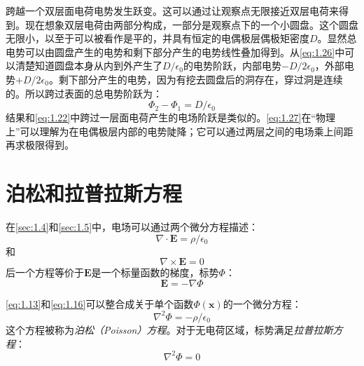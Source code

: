 \documentclass[12pt]{book}
\numberwithin{equation}{chapter}
\numberwithin{figure}{chapter}
\numberwithin{footnote}{page}
\begin{document}
跨越一个双层面电荷电势发生跃变。这可以通过让观察点无限接近双层电荷来得到。现在想象双层电荷由两部分构成，一部分是观察点下的一个小圆盘。这个圆盘无限小，以至于可以被看作是平的，并具有恒定的电偶极层偶极矩密度$D$。显然总电势可以由圆盘产生的电势和剩下部分产生的电势线性叠加得到。从\autoref{eq:1.26}中可以清楚知道圆盘本身从内到外产生了$D/\epsilon_0$的电势阶跃，内部电势$-D/2\epsilon_0$，外部电势$+D/2\epsilon_0$。剩下部分产生的电势，因为有挖去圆盘后的洞存在，穿过洞是连续的。所以跨过表面的总电势阶跃为：
\begin{equation}\label{eq:1.27}
    \Phi_2-\Phi_1=D/\epsilon_0
\end{equation}
结果和\autoref{eq:1.22}中跨过一层面电荷产生的电场阶跃是类似的。\autoref{eq:1.27}在“物理上”可以理解为在电偶极层内部的电势陡降；它可以通过两层之间的电场乘上间距再求极限得到。

\section{泊松和拉普拉斯方程}\label{sec:1.7}

在\autoref{sec:1.4}和\autoref{sec:1.5}中，电场可以通过两个微分方程描述：
$$\nabla\cdot\mathbf{E}=\rho/\epsilon_0$$
和
$$\nabla\times\mathbf{E}=0$$
后一个方程等价于$\mathbf{E}$是一个标量函数的梯度，标势$\Phi$：
$$\mathbf{E}=-\nabla\Phi$$

\autoref{eq:1.13}和\autoref{eq:1.16}可以整合成关于单个函数$\Phi(\mathbf{x})$的一个微分方程：
\begin{equation}
    \nabla^2\Phi=-\rho/\epsilon_0\label{eq:1.28}
\end{equation}
这个方程被称为\textit{泊松（Poisson）方程}。对于无电荷区域，标势满足\textit{拉普拉斯方程}：
\begin{equation}\label{eq:1.29}
    \nabla^2\Phi=0
\end{equation}
\end{document}

